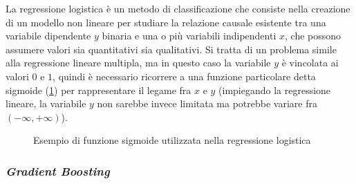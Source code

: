 \documentclass[12pt,a4paper,oneside]{article}
\begin{document}
La regressione logistica \cite{PATTERN_RECOGNITION} è un metodo di classificazione che consiste nella creazione di un modello non lineare per studiare la relazione causale esistente tra una variabile dipendente $y$ binaria e una o più variabili indipendenti $x$, che possono assumere valori sia quantitativi sia qualitativi. Si tratta di un problema simile alla regressione lineare multipla, ma in questo caso la variabile $y$ è vincolata ai valori $0$ e $1$, quindi è necessario ricorrere a una funzione particolare detta sigmoide (\cref{fig:logistic}) per rappresentare il legame fra $x$ e $y$ (impiegando la regressione lineare, la variabile $y$ non sarebbe invece limitata ma potrebbe variare fra $(-\infty,+\infty)$).
\begin{figure}[!htb]
    \centering
    \caption{Esempio di funzione sigmoide utilizzata nella regressione logistica}\label{fig:logistic}
\end{figure}



\subsubsection*{\textit{Gradient Boosting}}
\end{document}

